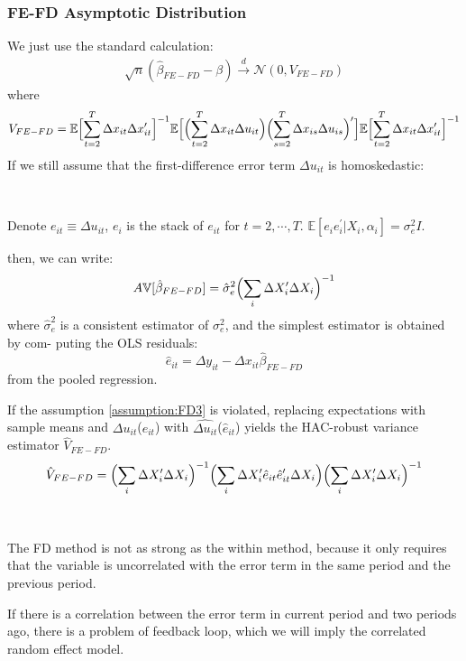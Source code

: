 \subsubsection{FE-FD Asymptotic Distribution}
We just use the standard calculation:
\begin{gather*}
    \sqrt{n} (\hat{\beta}_{FE-FD} - \beta) \overset{d}{\rightarrow} \mathcal{N} (0, V_{FE-FD})
\end{gather*}
where
\begin{gather*}
    V_{FE-FD} = \mathbb{E}\Bigl[ \sum_{t=2}^{T} \Delta x_{it} \Delta x_{it}^{\prime} \Bigr]^{-1} \mathbb{E}\Bigl[ \Bigl( \sum_{t=2}^{T} \Delta x_{it} \Delta u_{it} \Bigr) \Bigl( \sum_{s=2}^{T} \Delta x_{is} \Delta u_{is} \Bigr)^{\prime} \Bigr] \mathbb{E}\Bigl[ \sum_{t=2}^{T} \Delta x_{it} \Delta x_{it}^{\prime} \Bigr]^{-1} 
\end{gather*}
If we still assume that the first-difference error term $\Delta u_{it}$ is homoskedastic:
\begin{assumption}[FD homoskedasticity]\label{assumption:FD3}
    \

    Denote $e_{it} \equiv \Delta u_{it}$, $e_i$ is the stack of $e_{it}$ for $t=2, \cdots, T$. 
    $\mathbb{E}\left[e_i e_i^{\prime} | X_i, \alpha_i \right] = \sigma_e^2 I.$
\end{assumption}
then, we can write:
\begin{gather*}
    A\mathbb{V}[\hat{\beta}_{FE-FD}] = \hat{\sigma}_e^2 \Bigl(\sum_{i} \Delta X_i^{\prime} \Delta X_i \Bigr)^{-1} 
\end{gather*}
where $\hat{\sigma}_e^2$ is a consistent estimator of $\sigma_e^2$, and the simplest estimator is obtained by com-
puting the OLS residuals:
\[
\hat{e}_{it} = \Delta y_{it} - \Delta x_{it} \hat{\beta}_{FE-FD}
\]
from the pooled regression.

If the assumption \ref{assumption:FD3} is violated,
replacing expectations with sample means and $\Delta u_{it}$($e_{it}$) with $\widehat{\Delta u_{it}}$($\hat{e}_{it} $) yields the HAC-robust variance estimator $\hat{V}_{FE-FD}.$
\begin{gather*}
    \hat{V}_{FE-FD} = \Bigl( \sum_{i} \Delta X_i^{\prime} \Delta X_i \Bigr)^{-1}  \Bigl( \sum_{i} \Delta X_i^{\prime} \hat{e}_{it} \hat{e}_{it}^{\prime} \Delta X_i \Bigr) \Bigl( \sum_{i} \Delta X_i^{\prime} \Delta X_i \Bigr)^{-1} 
\end{gather*}

\begin{remark}
    \

    The FD method is not as strong as the within method, because it only requires that the variable is
    uncorrelated with the error term in the same period and the previous period.

    If there is a correlation between the error term in current period and two periods ago, there is a problem of feedback loop,
    which we will imply the correlated random effect model.
\end{remark}

